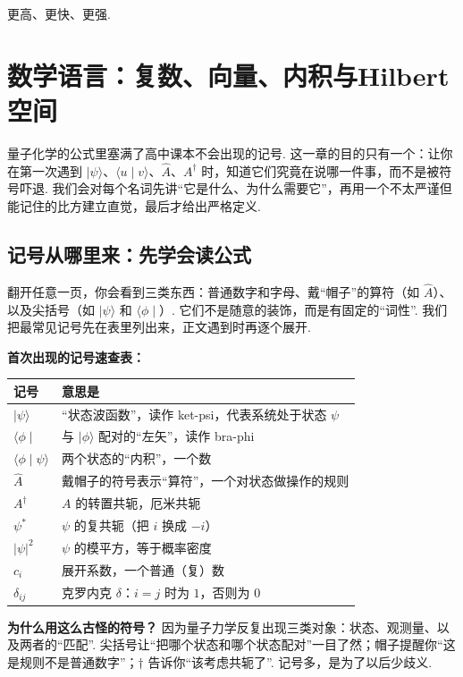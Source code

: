 \documentclass[UTF8,11pt,a4paper,openany]{ctexbook}
\newcommand{\ket}[1]{\lvert #1\rangle}\newcommand{\bra}[1]{\langle #1\rvert}
\begin{document}
\begin{analogybox}
    更高、更快、更强.
\end{analogybox}

\chapter{数学语言：复数、向量、内积与Hilbert空间}
量子化学的公式里塞满了高中课本不会出现的记号. 这一章的目的只有一个：让你在第一次遇到 $\ket\psi$、$\langle u\mid v\rangle$、$\hat A$、$A^\dagger$ 时，知道它们究竟在说哪一件事，而不是被符号吓退. 我们会对每个名词先讲“它是什么、为什么需要它”，再用一个不太严谨但能记住的比方建立直觉，最后才给出严格定义. 

\section{记号从哪里来：先学会读公式}
\label{sec:reading-math}
翻开任意一页，你会看到三类东西：普通数字和字母、戴“帽子”的算符（如 $\hat A$）、以及尖括号（如 $\ket\psi$ 和 $\langle\phi\mid$）. 它们不是随意的装饰，而是有固定的“词性”. 我们把最常见记号先在表里列出来，正文遇到时再逐个展开. 

\begin{notationbox}
\textbf{首次出现的记号速查表：}\\[2pt]
\begin{tabular}{@{}p{}p{}@{}}
\toprule
记号 & 意思是\\\midrule
$\ket\psi$ & “状态波函数”，读作 ket-psi，代表系统处于状态 $\psi$\\
$\langle\phi\mid$ & 与 $\ket\phi$ 配对的“左矢”，读作 bra-phi\\
$\langle\phi\mid\psi\rangle$ & 两个状态的“内积”，一个数\\
$\hat A$ & 戴帽子的符号表示“算符”，一个对状态做操作的规则\\
$A^\dagger$ & $A$ 的转置共轭，厄米共轭\\
$\psi^*$ & $\psi$ 的复共轭（把 $i$ 换成 $-i$）\\
$|\psi|^2$ & $\psi$ 的模平方，等于概率密度\\
$c_i$ & 展开系数，一个普通（复）数\\
$\delta_{ij}$ & 克罗内克 $\delta$：$i=j$ 时为 $1$，否则为 $0$\\
\bottomrule
\end{tabular}
\end{notationbox}

\textbf{为什么用这么古怪的符号？} 因为量子力学反复出现三类对象：状态、观测量、以及两者的“匹配”. 尖括号让“把哪个状态和哪个状态配对”一目了然；帽子提醒你“这是规则不是普通数字”；$\dagger$ 告诉你“该考虑共轭了”. 记号多，是为了以后少歧义. 
\end{document}
